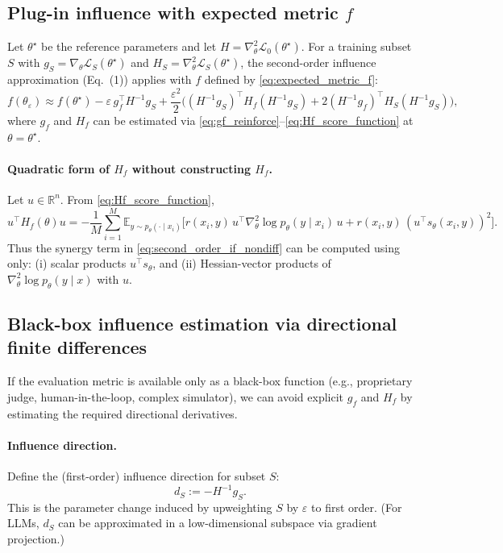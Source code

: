 \documentclass{article}
\theoremstyle{plain}
\theoremstyle{definition}
\theoremstyle{remark}
\begin{document}
\subsection{Plug-in influence with expected metric $f$}
Let $\theta^\star$ be the reference parameters and let $H=\nabla_\theta^2 \mathcal{L}_0(\theta^\star)$.
For a training subset $S$ with $g_S=\nabla_\theta \mathcal{L}_S(\theta^\star)$ and $H_S=\nabla_\theta^2 \mathcal{L}_S(\theta^\star)$,
the second-order influence approximation (Eq.~(1)) applies with $f$ defined by \eqref{eq:expected_metric_f}:
\begin{equation}
f(\theta_\varepsilon)
\approx
f(\theta^\star)
-\varepsilon\, g_f^\top H^{-1}g_S
+\frac{\varepsilon^2}{2}
\Big(
(H^{-1}g_S)^\top H_f (H^{-1}g_S)
+2(H^{-1}g_f)^\top H_S(H^{-1}g_S)
\Big),
\label{eq:second_order_if_nondiff}
\end{equation}
where $g_f$ and $H_f$ can be estimated via \eqref{eq:gf_reinforce}--\eqref{eq:Hf_score_function} at $\theta=\theta^\star$.

\paragraph{Quadratic form of $H_f$ without constructing $H_f$.}
Let $u \in \mathbb{R}^n$. From \eqref{eq:Hf_score_function},
\begin{equation}
u^\top H_f(\theta) u
=
-\frac{1}{M}\sum_{i=1}^M
\mathbb{E}_{y \sim p_\theta(\cdot\mid x_i)}
\Big[
r(x_i,y)\, u^\top \nabla_\theta^2 \log p_\theta(y\mid x_i)\, u
+
r(x_i,y)\, (u^\top s_\theta(x_i,y))^2
\Big].
\label{eq:ufHu_score}
\end{equation}
Thus the synergy term in \eqref{eq:second_order_if_nondiff} can be computed using only:
(i) scalar products $u^\top s_\theta$, and
(ii) Hessian-vector products of $\nabla_\theta^2 \log p_\theta(y\mid x)$ with $u$.

\subsection{Black-box influence estimation via directional finite differences}
If the evaluation metric is available only as a black-box function
(e.g., proprietary judge, human-in-the-loop, complex simulator),
we can avoid explicit $g_f$ and $H_f$ by estimating the required directional derivatives.

\paragraph{Influence direction.}
Define the (first-order) influence direction for subset $S$:
\begin{equation}
d_S := -H^{-1}g_S.
\label{eq:influence_direction}
\end{equation}
This is the parameter change induced by upweighting $S$ by $\varepsilon$ to first order.
(For LLMs, $d_S$ can be approximated in a low-dimensional subspace via gradient projection.)
\end{document}
